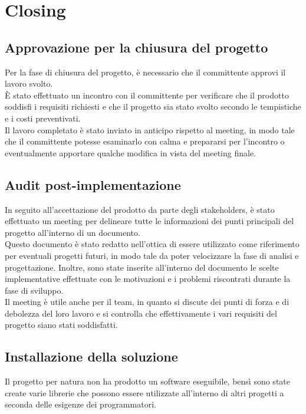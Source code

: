 \section{Closing}


\subsection{Approvazione per la chiusura del progetto}
Per la fase di chiusura del progetto, è necessario che il committente approvi il lavoro svolto.\\

È stato effettuato un incontro con il committente per verificare che il prodotto soddisfi i requisiti richiesti e che il progetto 
sia stato svolto secondo le tempistiche e i costi preventivati.\\

Il lavoro completato è stato inviato in anticipo rispetto al meeting, in modo tale che il committente potesse esaminarlo con calma 
e prepararsi per l'incontro o eventualmente apportare qualche modifica in vista del meeting finale.\\

\subsection{Audit post-implementazione}
In seguito all'accettazione del prodotto da parte degli stakeholders, è stato effettuato un meeting per delineare tutte le informazioni 
dei punti principali del progetto all'interno di un documento.\\

Questo documento è stato redatto nell'ottica di essere utilizzato come riferimento per eventuali progetti futuri, in modo tale 
da poter velocizzare la fase di analisi e progettazione.
Inoltre, sono state inserite all'interno del documento le scelte implementative effettuate con le motivazioni e i problemi riscontrati 
durante la fase di sviluppo.\\

Il meeting è utile anche per il team, in quanto si discute dei punti di forza e di debolezza del loro lavoro e si controlla che 
effettivamente i vari requisiti del progetto siano stati soddisfatti.\\

\subsection{Installazione della soluzione}
Il progetto per natura non ha prodotto un software eseguibile, bensì sono state create varie librerie che possono essere utilizzate 
all'interno di altri progetti a seconda delle esigenze dei programmatori.\\


